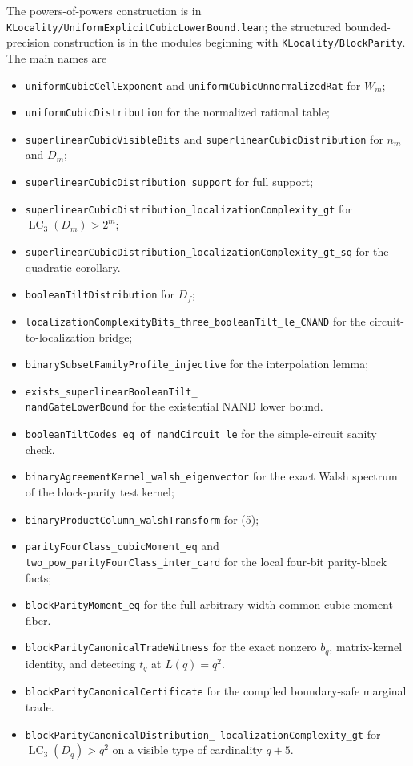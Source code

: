 \documentclass[11pt]{article}
\newcommand{\LC}{\operatorname{LC}}
\begin{document}
The powers-of-powers construction is in
\texttt{KLocality/UniformExplicitCubicLowerBound.lean}; the structured
bounded-precision construction is in the modules beginning with
\texttt{KLocality/BlockParity}.  The main names are
\begin{itemize}
  \item \texttt{uniformCubicCellExponent} and
  \texttt{uniformCubicUnnormalizedRat} for $W_m$;
  \item \texttt{uniformCubicDistribution} for the normalized rational table;
  \item \texttt{superlinearCubicVisibleBits} and
  \texttt{superlinearCubicDistribution} for $n_m$ and $D_m$;
  \item \texttt{superlinearCubicDistribution\_support} for full support;
  \item \texttt{superlinearCubicDistribution\_localizationComplexity\_gt}
  for $\LC_3(D_m)>2^m$;
  \item
  \texttt{superlinearCubicDistribution\_localizationComplexity\_gt\_sq}
  for the quadratic corollary.
  \item \texttt{booleanTiltDistribution} for $D_f$;
  \item
  \texttt{localizationComplexityBits\_three\_booleanTilt\_le\_CNAND}
  for the circuit-to-localization bridge;
  \item \texttt{binarySubsetFamilyProfile\_injective} for the interpolation
  lemma;
  \item
  \texttt{exists\_superlinearBooleanTilt\_}\\
  \texttt{nandGateLowerBound}
  for the existential NAND lower bound.
  \item
  \texttt{booleanTiltCodes\_eq\_of\_nandCircuit\_le}
  for the simple-circuit sanity check.
  \item \texttt{binaryAgreementKernel\_walsh\_eigenvector} for the exact
  Walsh spectrum of the block-parity test kernel;
  \item \texttt{binaryProductColumn\_walshTransform} for (5);
  \item \texttt{parityFourClass\_cubicMoment\_eq} and
  \texttt{two\_pow\_parityFourClass\_inter\_card} for the local four-bit
  parity-block facts;
  \item \texttt{blockParityMoment\_eq} for the full arbitrary-width common
  cubic-moment fiber.
  \item \texttt{blockParityCanonicalTradeWitness} for the exact nonzero
  $b_q$, matrix-kernel identity, and detecting $t_q$ at $L(q)=q^2$.
  \item \texttt{blockParityCanonicalCertificate} for the compiled
  boundary-safe marginal trade.
  \item
  \texttt{blockParityCanonicalDistribution\_}\
  \texttt{localizationComplexity\_gt} for
  $\LC_3(D_q)>q^2$ on a visible type of cardinality $q+5$.
\end{itemize}
\end{document}
